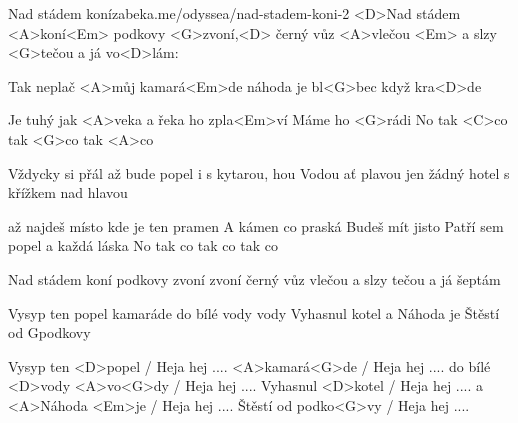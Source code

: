 \begin{song}[Buty]{34}{Nad stádem koní}{zabeka.me/odyssea/nad-stadem-koni-2}
<D>Nad stádem <A>koní<Em>
podkovy <G>zvoní,<D> černý vůz <A>vlečou <Em> a slzy <G>tečou
a já vo<D>lám:

Tak neplač <A>můj kamará<Em>de
náhoda je bl<G>bec když kra<D>de

Je tuhý jak <A>veka
a řeka ho zpla<Em>ví
Máme ho <G>rádi
No tak <C>co
tak <G>co
tak <A>co

Vždycky si přál
až bude popel
i s kytarou, hou
Vodou ať plavou
jen žádný hotel
s křížkem nad hlavou

až najdeš místo
kde je ten pramen
A kámen co praská
Budeš mít jisto
Patří sem popel
a každá láska
No tak co
tak co
tak co

Nad stádem koní
podkovy zvoní zvoní
černý vůz vlečou
a slzy tečou
a já šeptám

Vysyp ten popel
kamaráde
do bílé vody vody
Vyhasnul kotel
a Náhoda
je Štěstí od Gpodkovy

Vysyp ten <D>popel / Heja hej ....
<A>kamará<G>de / Heja hej ....
do bílé <D>vody <A>vo<G>dy / Heja hej .... 
Vyhasnul <D>kotel / Heja hej ....
a <A>Náhoda <Em>je / Heja hej ....
Štěstí od podko<G>vy / Heja hej ....
\end{song}
